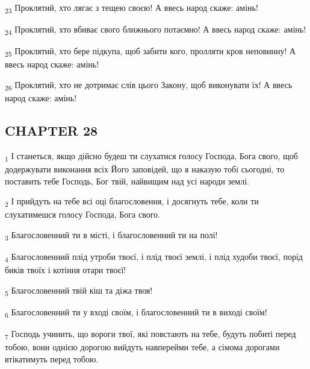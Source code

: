 \begin{tcolorbox}
\textsubscript{23} Проклятий, хто лягає з тещею своєю! А ввесь народ скаже: амінь!
\end{tcolorbox}
\begin{tcolorbox}
\textsubscript{24} Проклятий, хто вбиває свого ближнього потаємно! А ввесь народ скаже: амінь!
\end{tcolorbox}
\begin{tcolorbox}
\textsubscript{25} Проклятий, хто бере підкупа, щоб забити кого, пролляти кров неповинну! А ввесь народ скаже: амінь!
\end{tcolorbox}
\begin{tcolorbox}
\textsubscript{26} Проклятий, хто не дотримає слів цього Закону, щоб виконувати їх! А ввесь народ скаже: амінь!
\end{tcolorbox}
\subsection{CHAPTER 28}
\begin{tcolorbox}
\textsubscript{1} І станеться, якщо дійсно будеш ти слухатися голосу Господа, Бога свого, щоб додержувати виконання всіх Його заповідей, що я наказую тобі сьогодні, то поставить тебе Господь, Бог твій, найвищим над усі народи землі.
\end{tcolorbox}
\begin{tcolorbox}
\textsubscript{2} І прийдуть на тебе всі оці благословення, і досягнуть тебе, коли ти слухатимешся голосу Господа, Бога свого.
\end{tcolorbox}
\begin{tcolorbox}
\textsubscript{3} Благословенний ти в місті, і благословенний ти на полі!
\end{tcolorbox}
\begin{tcolorbox}
\textsubscript{4} Благословенний плід утроби твоєї, і плід твоєї землі, і плід худоби твоєї, порід биків твоїх і котіння отари твоєї!
\end{tcolorbox}
\begin{tcolorbox}
\textsubscript{5} Благословенний твій кіш та діжа твоя!
\end{tcolorbox}
\begin{tcolorbox}
\textsubscript{6} Благословенний ти у вході своїм, і благословенний ти в виході своїм!
\end{tcolorbox}
\begin{tcolorbox}
\textsubscript{7} Господь учинить, що вороги твої, які повстають на тебе, будуть побиті перед тобою, вони однією дорогою вийдуть навперейми тебе, а сімома дорогами втікатимуть перед тобою.
\end{tcolorbox}
